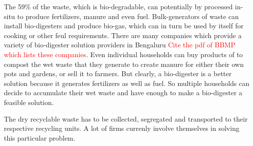 \documentclass[10pt]{article}
\begin{document}
The 59\% of the waste, which is bio-degradable, can potentially by processed in-situ to produce fertilizers, manure and even fuel. Bulk-generators of waste can install bio-digesters and produce bio-gas, which can in turn be used by itself for cooking or other feul requirements. There are many companies which provide a variety of bio-digester solution providers in Bengaluru \textcolor{red}{Cite the pdf of BBMP which lists these companies}. Even individual households can buy products of \cite{DailyDump:about} to compost the wet waste that they generate to create manure for either their own pots and gardens, or sell it to farmers. But clearly, a bio-digester is a better solution because it generates fertilizers as well as fuel. So multiple households can decide to accumulate their wet waste and have enough to make a bio-digester a feasible solution.

The dry recyclable waste has to be collected, segregated and transported to their respective recycling units. A lot of firms currenly involve themselves in solving this particular problem. 




\end{document}
